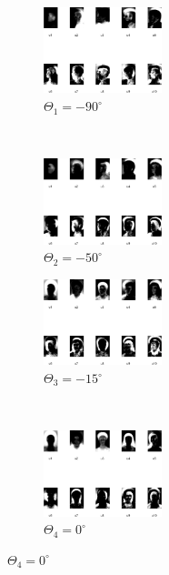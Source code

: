 \documentclass[runningheads,a4paper]{llncs}
\begin{document}
\begin{figure}
\centering
\begin{subfigure}[b]{0.4\textwidth}
	\centering
	\includegraphics[height=2.5cm]{Figures/10_eigen_faces_m90deg}
\caption{$\Theta_1= -90^{\circ}$}
\end{subfigure}~
\begin{subfigure}[b]{0.4\textwidth}
	\centering
	\includegraphics[height=2.5cm]{Figures/10_eigen_faces_m50deg}
\caption{$\Theta_2= -50^{\circ}$}
\end{subfigure}\vspace{5mm}
\begin{subfigure}[b]{0.4\textwidth}
	\centering
	\includegraphics[height=2.5cm]{Figures/10_eigen_faces_m15deg}
\caption{$\Theta_3= -15^{\circ}$}
\end{subfigure}~
\begin{subfigure}[b]{0.4\textwidth}
	\centering
	\includegraphics[height=2.5cm]{Figures/10_eigen_faces_0deg}
\caption{$\Theta_4= 0^{\circ}$}
\end{subfigure}\vspace{5mm}


\end{figure}
\end{document}

